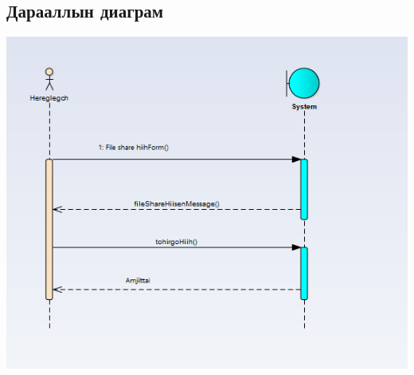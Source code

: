 \documentclass[12pt]{article}
\begin{document}
\begin{itemize}
    \section{Дарааллын диаграм}
    \includegraphics[scale=0.80]{image/seq.PNG}
\end{itemize}
\end{document}
